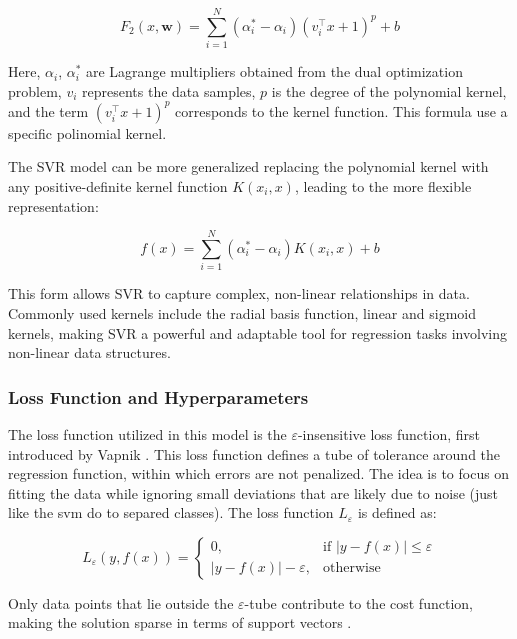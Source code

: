 \documentclass[8pt,twocolumn]{article}
\begin{document}
\begin{equation}
F_2(x, \mathbf{w}) = \sum_{i=1}^{N} (\alpha_i^* - \alpha_i) (v_i^\top x + 1)^p + b
\end{equation}

Here, $\alpha_i$, $\alpha_i^*$ are Lagrange multipliers obtained from the dual optimization
problem, $v_i$ represents the data samples, $p$ is the degree of the polynomial kernel, and the term $(v_i^\top x + 1)^p$ corresponds to the kernel
function. This formula use a specific polinomial kernel.

The SVR model can be more generalized replacing the polynomial kernel with any positive-definite
kernel function $K(x_i, x)$, leading to the more flexible representation:

\begin{equation}
f(x) = \sum_{i=1}^{N} (\alpha_i^* - \alpha_i) K(x_i, x) + b
\end{equation}

This form allows SVR to capture complex, non-linear relationships in data.
Commonly used kernels include the radial basis function, linear and sigmoid kernels,
making SVR a powerful and adaptable tool for regression tasks involving non-linear data structures.

\subsubsection{Loss Function and Hyperparameters}
The loss function utilized in this model is the $\varepsilon$-insensitive loss function, first
introduced by Vapnik \cite{vapnik1995nature}. This loss function defines a tube of tolerance around the regression function,
within which errors are not penalized. The idea is to focus on fitting the data while ignoring small deviations that
are likely due to noise (just like the svm do to separed classes). The loss function $L_\varepsilon$ is defined as:

\begin{equation}
L_\varepsilon(y, f(x)) = 
\begin{cases}
0, & \text{if } |y - f(x)| \leq \varepsilon \\
|y - f(x)| - \varepsilon, & \text{otherwise}
\end{cases}
\end{equation}

Only data points that lie outside the $\varepsilon$-tube contribute to
the cost function, making the solution sparse in terms of support vectors \cite{smola1998tutorial}.
\end{document}
